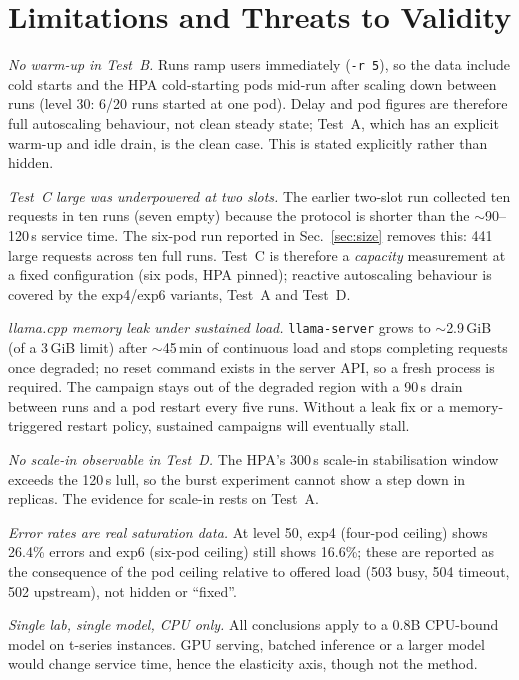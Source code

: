 \documentclass[conference]{IEEEtran}
\newcommand{\code}[1]{\texttt{#1}}
\begin{document}
\section{Limitations and Threats to Validity}
\label{sec:limits}

\emph{No warm-up in Test~B.} Runs ramp users immediately
(\code{-r 5}), so the data include cold starts and the HPA cold-starting pods
mid-run after scaling down between runs (level 30: 6/20 runs started at one
pod). Delay and pod figures are therefore full autoscaling behaviour, not clean
steady state; Test~A, which has an explicit warm-up and idle drain, is the
clean case. This is stated explicitly rather than hidden.

\emph{Test~C large was underpowered at two slots.} The earlier two-slot run
collected ten requests in ten runs (seven empty) because the protocol is
shorter than the $\sim$90--120\,s service time. The six-pod run reported in
Sec.~\ref{sec:size} removes this: 441 large requests across ten full runs.
Test~C is therefore a \emph{capacity} measurement at a fixed configuration
(six pods, HPA pinned); reactive autoscaling behaviour is covered by the
exp4/exp6 variants, Test~A and Test~D.

\emph{llama.cpp memory leak under sustained load.} \code{llama-server} grows
to $\sim$2.9\,GiB (of a 3\,GiB limit) after $\sim$45\,min of continuous load and stops
completing requests once degraded; no reset command exists in the server API,
so a fresh process is required. The campaign stays out of the degraded region
with a 90\,s drain between runs and a pod restart every five runs. Without a
leak fix or a memory-triggered restart policy, sustained campaigns will
eventually stall.

\emph{No scale-in observable in Test~D.} The HPA's 300\,s scale-in
stabilisation window exceeds the 120\,s lull, so the burst experiment cannot
show a step down in replicas. The evidence for scale-in rests on Test~A.

\emph{Error rates are real saturation data.} At level 50, exp4 (four-pod
ceiling) shows 26.4\% errors and exp6 (six-pod ceiling) still shows 16.6\%;
these are reported as the consequence of the pod ceiling relative to offered
load (503 busy, 504 timeout, 502 upstream), not hidden or ``fixed''.

\emph{Single lab, single model, CPU only.} All conclusions apply to a 0.8B
CPU-bound model on t-series instances. GPU serving, batched inference or a
larger model would change service time, hence the elasticity axis, though not
the method.
\end{document}
